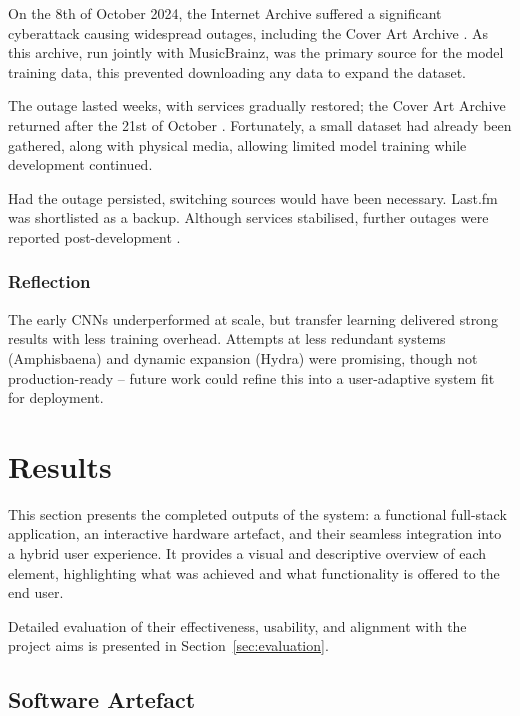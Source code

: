                 On the 8th of October 2024, the Internet Archive suffered a significant cyberattack causing widespread outages, including the Cover Art Archive \cite{forbes2024}. As this archive, run jointly with MusicBrainz, was the primary source for the model training data, this prevented downloading any data to expand the dataset.
    
                The outage lasted weeks, with services gradually restored; the Cover Art Archive returned after the 21st of October \cite{archiveBlog2024}. Fortunately, a small dataset had already been gathered, along with physical media, allowing limited model training while development continued.
    
                Had the outage persisted, switching sources would have been necessary. Last.fm was shortlisted as a backup. Although services stabilised, further outages were reported post-development \cite{hackread2024}.
    
            \subsubsection*{Reflection}
                The early CNNs underperformed at scale, but transfer learning delivered strong results with less training overhead. Attempts at less redundant systems (Amphisbaena) and dynamic expansion (Hydra) were promising, though not production-ready -- future work could refine this into a user-adaptive system fit for deployment.
    
    \section{Results} %
    
        This section presents the completed outputs of the system: a functional full-stack application, an interactive hardware artefact, and their seamless integration into a hybrid user experience. It provides a visual and descriptive overview of each element, highlighting what was achieved and what functionality is offered to the end user.
        
        Detailed evaluation of their effectiveness, usability, and alignment with the project aims is presented in Section~\ref{sec:evaluation}.
        
        \subsection{Software Artefact}
    

